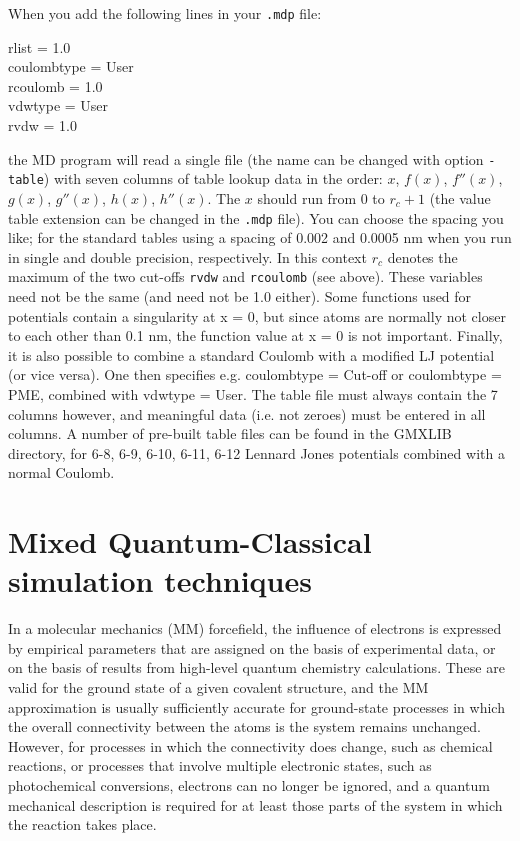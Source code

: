 When you add the following lines in your {\tt .mdp} file:\\
\begin{tt}
rlist           = 1.0\\
coulombtype     = User\\
rcoulomb        = 1.0\\
vdwtype         = User\\
rvdw            = 1.0\\
\end{tt}
the MD program will read a single file (the name can be changed with
option {\tt -table}) with seven columns of table lookup data in the
order: $x$, $f(x)$, $f''(x)$, $g(x)$, $g''(x)$, $h(x)$, $h''(x)$.
 The $x$ should run from 0 to $r_c+1$ (the value table extension can be
changed in the {\tt .mdp} file).
You can choose the spacing you like; for the standard tables {\gromacs}
using a spacing of 0.002 and 0.0005 nm when you run in single
and double precision, respectively.  In this
context $r_c$ denotes the maximum of the two cut-offs {\tt rvdw} and
{\tt rcoulomb} (see above). These variables need not be the same (and
need not be 1.0 either).  Some functions used for potentials contain a
singularity at x = 0, but since atoms are normally not closer to each
other than 0.1 nm, the function value at x = 0 is not important.
Finally, it is also
possible to combine a standard Coulomb with a modified LJ potential
(or vice versa). One then specifies e.g. coulombtype = Cut-off or
coulombtype = PME, combined with vdwtype = User.  The table file must
always contain the 7 columns however, and meaningful data (i.e. not
zeroes) must be entered in all columns.  A number of pre-built table
files can be found in the GMXLIB directory, for 6-8, 6-9, 6-10, 6-11, 6-12
Lennard Jones potentials combined with a normal Coulomb.

\section{Mixed Quantum-Classical simulation techniques}

In a molecular mechanics (MM) forcefield, the influence of electrons
is expressed by empirical parameters that are assigned on the basis of
experimental data, or on the basis of results from high-level quantum
chemistry calculations. These are valid for the ground state of a
given covalent structure, and the MM approximation is usually
sufficiently accurate for ground-state processes in which the overall
connectivity between the atoms is the system remains
unchanged. However, for processes in which the connectivity does
change, such as chemical reactions, or processes that involve multiple
electronic states, such as photochemical conversions, electrons can no
longer be ignored, and a quantum mechanical description is required
for at least those parts of the system in which the reaction takes
place.

